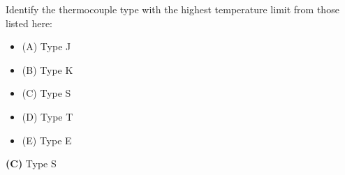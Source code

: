 

Identify the thermocouple type with the highest temperature limit from those listed here:

\begin{itemize}
\item{(A)} Type J
\vskip 5pt 
\item{(B)} Type K
\vskip 5pt 
\item{(C)} Type S
\vskip 5pt 
\item{(D)} Type T
\vskip 5pt 
\item{(E)} Type E
\end{itemize}







{\bf (C)} Type S
 










